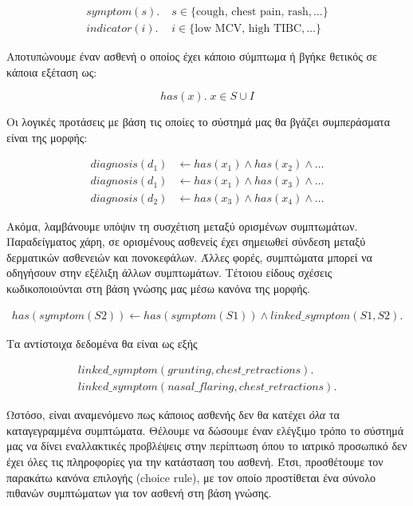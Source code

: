 \documentclass[12pt]{extarticle}
\begin{document}
\begin{align}
    symptom(s). & \; s \in \{ \text{cough, chest pain, rash}, \dots \} \\
    indicator(i). & \; i \in \{ \text{low MCV, high TIBC}, \dots \}
\end{align}

Αποτυπώνουμε έναν ασθενή ο οποίος έχει κάποιο σύμπτωμα ή βγήκε θετικός σε κάποια εξέταση ως: 

\begin{equation}
    has(x). \; x \in S \cup I
\end{equation}

Οι λογικές προτάσεις με βάση τις οποίες το σύστημά μας θα βγάζει συμπεράσματα είναι της μορφής: 

\begin{align}
    diagnosis(d_1) & \longleftarrow has(x_1) \land has(x_2) \land \dots \\
    diagnosis(d_1) & \longleftarrow has(x_1) \land has(x_3) \land \dots \\
    diagnosis(d_2) & \longleftarrow has(x_3) \land has(x_4) \land \dots
\end{align}

Ακόμα, λαμβάνουμε υπόψιν τη συσχέτιση μεταξύ ορισμένων συμπτωμάτων.
Παραδείγματος χάρη, σε ορισμένους ασθενείς έχει σημειωθεί σύνδεση  
μεταξύ δερματικών ασθενειών και πονοκεφάλων\cite{migraine-hives}.
Άλλες φορές, συμπτώματα μπορεί να οδηγήσουν στην εξέλιξη άλλων συμπτωμάτων.
Τέτοιου είδους σχέσεις κωδικοποιούνται στη βάση γνώσης μας μέσω κανόνα της μορφής.

\begin{align}
    has(symptom(S2)) \longleftarrow has(symptom(S1)) \land linked\_symptom(S1, S2).
\end{align}

Τα αντίστοιχα δεδομένα θα είναι ως εξής

\begin{align}
    linked\_symptom(grunting, chest\_retractions).\\
    linked\_symptom(nasal\_flaring, chest\_retractions).
\end{align}

Ωστόσο, είναι αναμενόμενο πως κάποιος ασθενής δεν θα κατέχει \textit{όλα} τα καταγεγραμμένα συμπτώματα.
Θέλουμε να δώσουμε έναν ελέγξιμο τρόπο το σύστημά μας να δίνει εναλλακτικές προβλέψεις
στην περίπτωση όπου το ιατρικό προσωπικό δεν έχει όλες τις πληροφορίες για την κατάσταση του ασθενή.
Έτσι, προσθέτουμε τον παρακάτω κανόνα επιλογής (choice rule), με τον οποίο προστίθεται 
ένα σύνολο πιθανών συμπτώματων για τον ασθενή στη βάση γνώσης.
\end{document}
